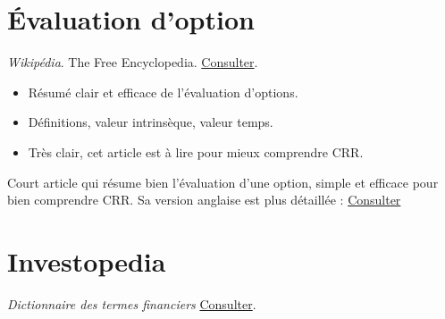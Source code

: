 \documentclass[a4paper,10pt]{article}
\begin{document}
\section*{Évaluation d'option}
{}
\textit{Wikipédia}. The Free Encyclopedia. \href{https://fr.wikipedia.org/wiki/Évaluation_d%27option}{Consulter}.
\begin{itemize}
    \item Résumé clair et efficace de l'évaluation d'options.
    \item Définitions, valeur intrinsèque, valeur temps.
    \item Très clair, cet article est à lire pour mieux comprendre CRR.
\end{itemize}
Court article qui résume bien l'évaluation d'une option, simple et efficace pour bien comprendre CRR. Sa version anglaise est plus détaillée : \href{https://en.wikipedia.org/wiki/Valuation_of_options}{Consulter}



\section*{Investopedia}
{}
\textit{Dictionnaire des termes financiers} \href{https://www.investopedia.com/financial-term-dictionary-4769738}{Consulter}.
\end{document}
